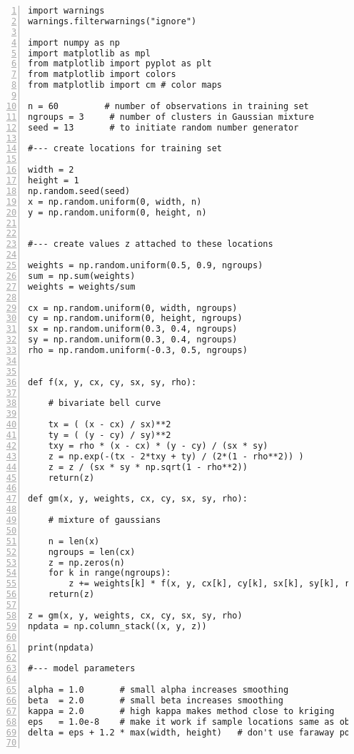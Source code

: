 \documentclass[oneside,10pt]{book}
\begin{document}
\begin{lstlisting}[numbers=left]
import warnings
warnings.filterwarnings("ignore")

import numpy as np
import matplotlib as mpl
from matplotlib import pyplot as plt
from matplotlib import colors  
from matplotlib import cm # color maps

n = 60         # number of observations in training set
ngroups = 3     # number of clusters in Gaussian mixture
seed = 13       # to initiate random number generator

#--- create locations for training set

width = 2
height = 1
np.random.seed(seed)
x = np.random.uniform(0, width, n)
y = np.random.uniform(0, height, n)


#--- create values z attached to these locations

weights = np.random.uniform(0.5, 0.9, ngroups)
sum = np.sum(weights)
weights = weights/sum

cx = np.random.uniform(0, width, ngroups)
cy = np.random.uniform(0, height, ngroups)
sx = np.random.uniform(0.3, 0.4, ngroups)
sy = np.random.uniform(0.3, 0.4, ngroups)
rho = np.random.uniform(-0.3, 0.5, ngroups)


def f(x, y, cx, cy, sx, sy, rho):

    # bivariate bell curve

    tx = ( (x - cx) / sx)**2
    ty = ( (y - cy) / sy)**2
    txy = rho * (x - cx) * (y - cy) / (sx * sy)
    z = np.exp(-(tx - 2*txy + ty) / (2*(1 - rho**2)) )
    z = z / (sx * sy * np.sqrt(1 - rho**2))
    return(z)

def gm(x, y, weights, cx, cy, sx, sy, rho):

    # mixture of gaussians

    n = len(x)
    ngroups = len(cx)
    z = np.zeros(n)   
    for k in range(ngroups):
        z += weights[k] * f(x, y, cx[k], cy[k], sx[k], sy[k], rho[k])
    return(z)

z = gm(x, y, weights, cx, cy, sx, sy, rho)
npdata = np.column_stack((x, y, z))

print(npdata)

#--- model parameters

alpha = 1.0       # small alpha increases smoothing
beta  = 2.0       # small beta increases smoothing
kappa = 2.0       # high kappa makes method close to kriging 
eps   = 1.0e-8    # make it work if sample locations same as observed ones
delta = eps + 1.2 * max(width, height)   # don't use faraway points for interpolation


\end{lstlisting}
\end{document}
